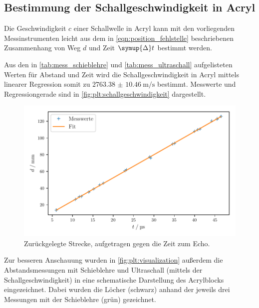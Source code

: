 \FloatBarrier
\subsection{Bestimmung der Schallgeschwindigkeit in Acryl}
\label{sec:auswertung:schallgeschwindigkeit}

Die Geschwindigkeit $c$ einer Schallwelle in Acryl kann mit den vorliegenden Messinstrumenten
leicht aus dem in \autoref{eqn:position_fehlstelle} beschriebenen
Zusammenhang von Weg $d$ und Zeit $\symup{\Delta}t$ bestimmt werden.

Aus den in \autoref{tab:mess_schieblehre} und \autoref{tab:mess_ultraschall} aufgelisteten Werten für Abstand und Zeit
wird die Schallgeschwindigkeit in Acryl mittels linearer Regression somit zu $\SI{2763.38(1046)}{\meter\per\second}$ bestimmt. Messwerte und Regressiongerade sind in \autoref{fig:plt:schallgeschwindigkeit} dargestellt.

\begin{figure}[H]
  \centering
  \includegraphics[width=\textwidth]{build/plt/schallgeschwindigkeit.pdf}
  \caption{Zurückgelegte Strecke, aufgetragen gegen die Zeit zum Echo.}
  \label{fig:plt:schallgeschwindigkeit}
\end{figure}

Zur besseren Anschauung wurden in \autoref{fig:plt:visualization} außerdem die Abstandsmessungen mit Schieblehre
und Ultraschall (mittels der Schallgeschwindigkeit)
in eine schematische Darstellung des Acrylblocks eingezeichnet.
Dabei wurden die Löcher (schwarz) anhand der jeweils drei Messungen mit der Schieblehre (grün) gezeichnet.


